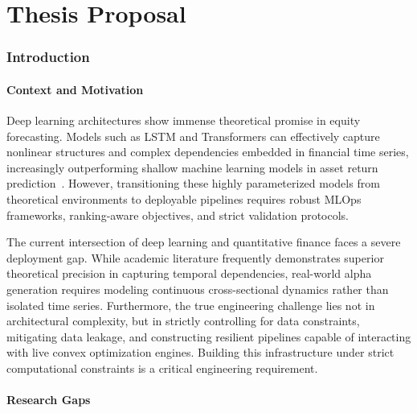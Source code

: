 \setcounter{page}{1}

\part{Thesis Proposal}

\section{Introduction}

\subsection*{Context and Motivation}

Deep learning architectures show immense theoretical promise in equity forecasting. Models such as \ac{LSTM} and Transformers can effectively capture nonlinear structures and complex dependencies embedded in financial time series, increasingly outperforming shallow machine learning models in asset return prediction~\cite{Ellery2025}. However, transitioning these highly parameterized models from theoretical environments to deployable pipelines requires robust \ac{MLOps} frameworks, ranking-aware objectives, and strict validation protocols.

\medskip

The current intersection of deep learning and quantitative finance faces a severe deployment gap. While academic literature frequently demonstrates superior theoretical precision in capturing temporal dependencies, real-world alpha generation requires modeling continuous cross-sectional dynamics rather than isolated time series. Furthermore, the true engineering challenge lies not in architectural complexity, but in strictly controlling for data constraints, mitigating data leakage, and constructing resilient pipelines capable of interacting with live convex optimization engines. Building this infrastructure under strict computational constraints is a critical engineering requirement.

\subsection*{Research Gaps}

